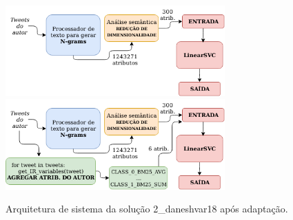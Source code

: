 \begin{figure}[h]
    \centering
    \caption{Arquitetura de sistema da solução 2\_daneshvar18 após adaptação.}
    \begin{center}
        \begin{overprint}
            \centering\includegraphics[width=0.75\textwidth]{img/2-daneshvar18-arquitetura-sem-ri.png}\centering\includegraphics[width=0.75\textwidth]{img/2-daneshvar18-arquitetura-com-ri.png}
        \end{overprint}
    \end{center}
    \vspace{-0.0cm}
    \label{fig:2-daneshvar18-arquitetura-com-ri}
\end{figure}